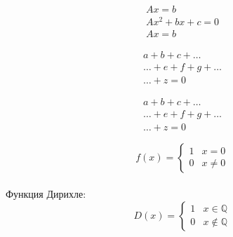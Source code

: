 \documentclass[a4paper, 12pt]{article}
\begin{document}
    \begin{gather*} %
        Ax = b %
        \\ %
        Ax^2 + bx + c = 0 %
        \\ %
        Ax = b %
    \end{gather*}

    
    \begin{multline} %
        a + b + c + \dots
        \\ %
        \dots + e + f + g + \dots
        \\ %
        \dots + z = 0
    \end{multline}

    \begin{multline*} %
        a + b + c + \dots
        \\ %
        \dots + e + f + g + \dots
        \\ %
        \dots + z = 0
    \end{multline*}



    \[f(x) = \begin{cases}
        1 & x = 0
        \\ %
        0 & x \ne 0 %
    \end{cases}\]\\

    Функция Дирихле:
    \[D(x) = \begin{cases}
        1 & x \in \mathbb Q
        \\ %
        0 & x \not\in \mathbb Q %
    \end{cases}\]
\end{document}
